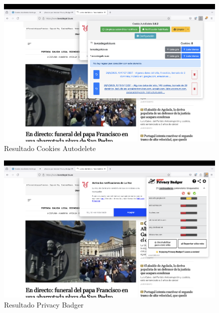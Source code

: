 \begin{figure}[H]   
    \centering
    \includegraphics[width=\textwidth]{resultado_cookies_autodelete.png}
    \caption{Resultado Cookies Autodelete}
    \label{fig:resultado_cookies_autodelete}
\end{figure}
\begin{figure}[H]   
    \centering
    \includegraphics[width=\textwidth]{resultado_privacybadger.png}
    \caption{Resultado Privacy Badger}
    \label{fig:resultado_privacybadger}
\end{figure}
